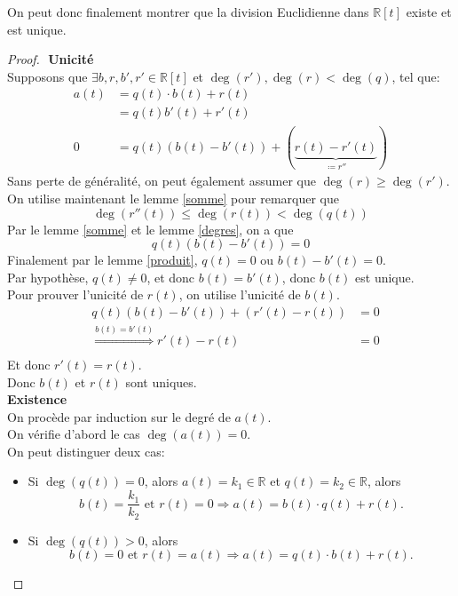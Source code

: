 \documentclass[11pt, a4paper, twoside]{article}
\begin{document}
On peut donc finalement montrer que la division Euclidienne dans $\mathbb{R}[t]$ existe et est unique.
\begin{proof}
$ $\newline
\textbf{Unicité}\\
Supposons que $\exists b,r,b',r' \in \mathbb{R}[t]$ et $\deg(r'),\deg(r) < \deg(q)$, tel que:
\begin{align*}
	a(t) &= q(t) \cdot b(t) + r(t)\\
	     &= q(t) b'(t) + r'(t)\\
	0 &= q(t)(b(t) - b'(t)) + (\underbrace{  r(t) - r'(t) }_{\coloneqq r''}) 
\end{align*}
Sans perte de généralité, on peut également assumer que $\deg(r) \geq \deg(r')$.\\
On utilise maintenant le lemme \ref{somme} pour remarquer que
\[ 
	\deg(r''(t)) \leq \deg(r(t)) < \deg(q(t))
\]
Par le lemme \ref{somme} et le lemme \ref{degres}, on a que 
\[ 
	q(t)(b(t) - b'(t)) = 0
\]
Finalement par le lemme \ref{produit}, $q(t)=0$ ou $b(t)-b'(t)=0$.\\
Par hypothèse, $q(t)\neq 0$, et donc $b(t) = b'(t) $, donc $b(t)$ est unique.\\
Pour prouver l'unicité de $r(t)$, on utilise l'unicité de $b(t)$.
\begin{align*}
&q(t)(b(t) - b'(t)) + ( r'(t) - r(t)) &= 0\\
&\overset{b(t)=b'(t)}{\Rightarrow}  r'(t) - r(t) &= 0\\
\end{align*}
Et donc $r'(t)=r(t)$.\\
Donc $b(t)$ et $r(t)$ sont uniques.\\

\textbf{Existence}\\
On procède par induction sur le degré de $a(t)$.\\
On vérifie d'abord le cas $\deg(a(t))=0$.\\
On peut distinguer deux cas:
\begin{itemize}
	\item Si $\deg(q(t))=0$, alors $a(t) = k_1 \in \mathbb{R}$ et $q(t) = k_2 \in \mathbb{R}$, alors
\[ 
	b(t) = \frac{k_1}{k_2} \text{ et } r(t)=0 \Rightarrow a(t) = b(t) \cdot q(t) + r(t)
.\]
\item Si $\deg(q(t))> 0$, alors
\[ 
	b(t) = 0  \text{ et } r(t) = a(t) \Rightarrow  a(t) = q(t) \cdot b(t) + r(t)
.\]


\end{itemize}
\end{proof}
\end{document}
